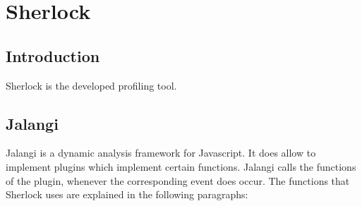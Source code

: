 \section{Sherlock}
\subsection{Introduction}
Sherlock is the developed profiling tool.

\subsection{Jalangi}
Jalangi is a dynamic analysis framework for Javascript. It does allow to implement plugins which implement certain functions. Jalangi calls the functions of the plugin, whenever the corresponding event does occur. The functions that Sherlock uses are explained in the following paragraphs:

